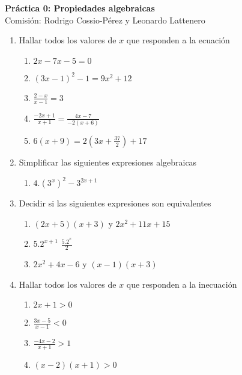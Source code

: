 \documentclass[a4paper]{article}
\newcommand{\exercise}{\item}
\begin{document}
\noindent \hrulefill 
\vspace{-7pt}
\begin{center} 
	\textbf{ Práctica 0: Propiedades algebraicas} \\
	Comisión: Rodrigo Cossio-Pérez y Leonardo Lattenero
\end{center}
\vspace{-10pt}
\hrulefill
\begin{enumerate}
	\exercise Hallar todos los valores de $x$ que responden a la ecuación
	\begin{enumerate} [label=(\alph*)]
		\item $2x-7x-5=0$
		\item $(3x-1)^2-1=9x^2+12$
		\item $\displaystyle\frac{2-x}{x-1}=3$
		\item $\displaystyle\frac{-2x+1}{x+1}=\displaystyle\frac{4x-7}{-2(x+6)}$
		\item $6(x+9)=2(3x+\displaystyle\frac{37}{2})+17$
	\end{enumerate}
	\exercise Simplificar las siguientes expresiones algebraicas
	\begin{enumerate} [label=(\alph*)]
		\item $4.\left(3^{x}\right)^{2}-3^{2x+1}$
	\end{enumerate}
	\exercise Decidir si las siguientes expresiones son equivalentes
	\begin{enumerate} [label=(\alph*)]
		\item $(2x+5)(x+3)$ y $2x^2+11x+15$
		\item $5.2^{x+1}$ $\displaystyle\frac{5.2^{x}}{2}$
		\item $2x^2+4x-6$ y $(x-1)(x+3)$
	\end{enumerate}
	\exercise Hallar todos los valores de $x$ que responden a la inecuación
	\begin{enumerate} [label=(\alph*)]
		\item $2x+1>0$
		\item $\displaystyle\frac{3x-5}{x-1}<0$
		\item $\displaystyle\frac{-4x-2}{x+1}>1$
		\item $(x-2)(x+1)>0$

\end{enumerate}
\end{enumerate}
\end{document}

